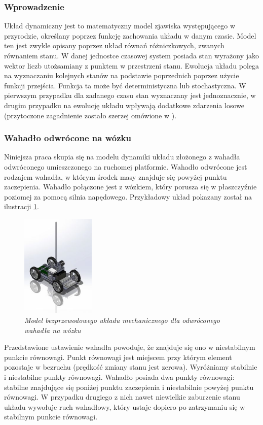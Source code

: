 \documentclass[12pt, oneside]{report}
\theoremstyle{definition}
\begin{document}
\subsubsection{Wprowadzenie}
Układ dynamiczny jest to matematyczny model zjawiska występującego w przyrodzie, określany poprzez funkcję zachowania układu w danym czasie. Model ten jest zwykle opisany poprzez układ równań różniczkowych, zwanych równaniem stanu. W danej jednostce czasowej system posiada stan wyrażony jako wektor liczb utożsamiany z punktem w przestrzeni stanu. Ewolucja układu polega na wyznaczaniu kolejnych stanów na podstawie poprzednich poprzez użycie funkcji przejścia. Funkcja ta może być deterministyczna lub stochastyczna. W pierwszym przypadku dla zadanego czasu stan wyznaczany jest jednoznacznie, w drugim przypadku na ewolucję układu wpływają dodatkowe zdarzenia losowe (przytoczone zagadnienie zostało szerzej omówione w \cite{MarciniakDynamicSystems}).

\subsubsection{Wahadło odwrócone na wózku}
\label{SubsectionPendulumIntro}
Niniejsza praca skupia się na modelu dynamiki układu złożonego z wahadła odwróconego umieszczonego na ruchomej platformie. Wahadło odwrócone jest rodzajem wahadła, w którym środek masy znajduje się powyżej punktu zaczepienia. Wahadło połączone jest z wózkiem, który porusza się w płaszczyźnie poziomej za pomocą silnia napędowego. Przykładowy układ pokazany został na ilustracji \ref{SystemModelImage}.

\begin{figure}[H]
	\centering
		\includegraphics[width = 100pt]{SystemModel} 
		\caption{\textit{Model bezprzewodowego układu mechanicznego dla odwróconego wahadła na wózku \cite{SystemModel}}}
		\label{SystemModelImage}
\end{figure}

Przedstawione ustawienie wahadła powoduje, że znajduje się ono w niestabilnym punkcie równowagi. Punkt równowagi jest miejscem przy którym element pozostaje w bezruchu (prędkość zmiany stanu jest zerowa). Wyróżniamy stabilnie i niestabilne punkty równowagi. Wahadło posiada dwa punkty równowagi: stabilne znajdujące się poniżej punktu zaczepienia i niestabilnie powyżej punktu równowagi. W przypadku drugiego z nich nawet niewielkie zaburzenie stanu układu wywołuje ruch wahadłowy, który ustaje dopiero po zatrzymaniu się w stabilnym punkcie równowagi. 
\end{document}
